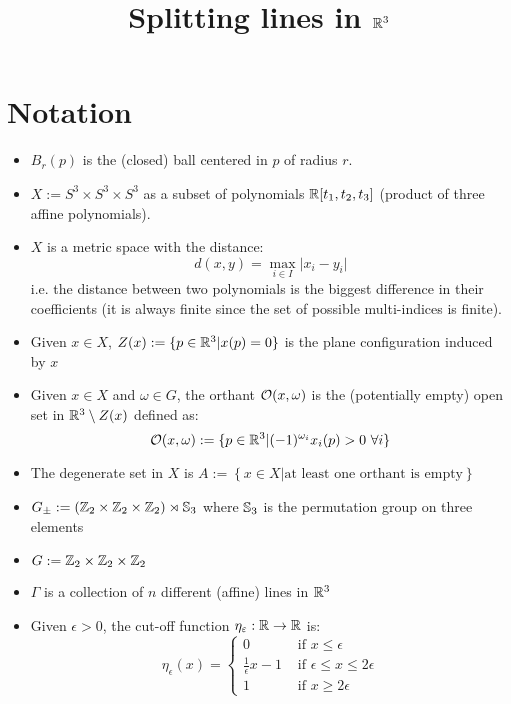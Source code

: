 \documentclass[9pt]{article}
\title{Splitting lines in $\mathbb{R}^3$}
\date{}
\author{}
\begin{document}
\maketitle
\section*{Notation}
\begin{itemize}
\item $B_r(p)$ is the (closed) ball centered in $p$ of radius $r$.
\item $X := S^3\times S^3 \times S^3$ as a subset of polynomials $\mathbb{R}[t_1, t_2, t_3]$ (product of three affine polynomials).
\item $X$ is a metric space with the distance:
  \[
    d(x,y) = \max_{i\in I}\vert x_i - y_i\vert
  \]
  i.e. the distance between two polynomials is the biggest difference in their coefficients (it is always finite since the set of possible multi-indices is finite).

    \item Given $x\in X$, $Z(x) := \{p\in \mathbb{R}^3 \vert x(p) = 0\}$ is the plane configuration induced by $x$
    \item Given $x\in X$ and $\omega \in G$, the orthant $\mathcal{O}(x, \omega)$ is the (potentially empty) open set in $\mathbb{R}^3 \setminus Z(x)$ defined as:
    \[
        \mathcal{O}(x, \omega) := \{p\in \mathbb{R}^3\vert (-1)^{\omega_i}x_i(p)>0\ \forall i\}
    \]

    \item The degenerate set in $X$ is
     $A :=\left\{x\in X \vert \mbox{at least one orthant is empty}\right\}$
    \item $G_\pm :=  \left(\mathbb{Z}_2\times \mathbb{Z}_2 \times \mathbb{Z}_2\right) \rtimes \mathbb{S}_3$ where $\mathbb{S}_3$ is the permutation group on three elements
    \item $G := \mathbb{Z}_2\times \mathbb{Z}_2 \times \mathbb{Z}_2$
    \item $\Gamma$ is a collection of $n$ different (affine) lines in $\mathbb{R}^3$
    \item Given $\epsilon>0$, the cut-off function $\eta_\varepsilon: \mathbb{R} \rightarrow \mathbb{R}$ is:
    \[
        \eta_\epsilon(x)= \begin{cases}
            0 & \mbox{ if }x\leq \epsilon\\
            \frac{1}{\epsilon}x -1 & \mbox{ if }\epsilon\leq x \leq 2\epsilon\\
            1 & \mbox{ if } x\geq 2\epsilon
        \end{cases}
      \]
\end{itemize}
\end{document}
